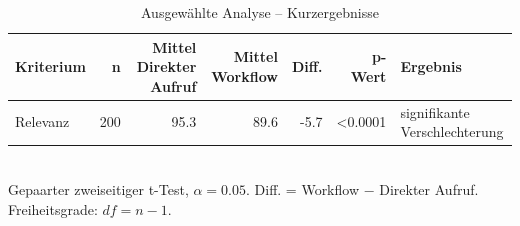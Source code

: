 \begin{table}[htbp]
\centering
\caption{Ausgewählte Analyse -- Kurzergebnisse}
\begin{tabular}{lrrrrrl}
\toprule
Kriterium & n & Mittel Direkter Aufruf & Mittel Workflow & Diff. & p-Wert & Ergebnis \\
\midrule
Relevanz & 200 & 95.3 & 89.6 & -5.7 & <0.0001 & signifikante Verschlechterung \\
\bottomrule
\end{tabular}
\\[2mm]
\footnotesize Gepaarter zweiseitiger t-Test, $\alpha=0.05$. Diff. = Workflow $-$ Direkter Aufruf. Freiheitsgrade: $df=n-1$.
\end{table}
